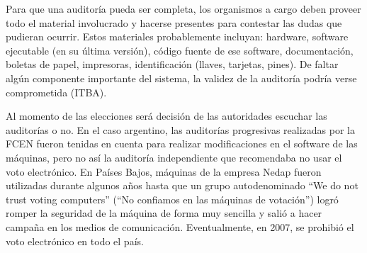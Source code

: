 Para que una auditoría pueda ser completa, los organismos a cargo deben proveer todo el material involucrado y hacerse presentes para contestar las dudas que pudieran ocurrir. Estos materiales probablemente incluyan: hardware, software ejecutable (en su última versión), código fuente de ese software, documentación, boletas de papel, impresoras, identificación (llaves, tarjetas, pines). De faltar algún componente importante del sistema, la validez de la auditoría podría verse comprometida (ITBA).

Al momento de las elecciones será decisión de las autoridades escuchar las auditorías o no. En el caso argentino, las auditorías progresivas realizadas por la FCEN fueron tenidas en cuenta para realizar modificaciones en el software de las máquinas, pero no así la auditoría independiente que recomendaba no usar el voto electrónico. En Países Bajos, máquinas de la empresa Nedap fueron utilizadas durante algunos años hasta que un grupo autodenominado “We do not trust voting computers” (“No confiamos en las máquinas de votación”) logró romper la seguridad de la máquina de forma muy sencilla y salió a hacer campaña en los medios de comunicación. Eventualmente, en 2007, se prohibió el voto electrónico en todo el país.
